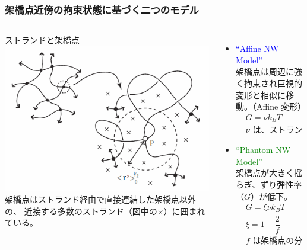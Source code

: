 \documentclass[12pt, dvipdfmx]{beamer}
\begin{document}
\begin{frame}
	\frametitle{架橋点近傍の拘束状態に基づく二つのモデル}
	\vspace{-3mm}
		\begin{columns}[totalwidth=1\textwidth]
				\begin{block}{ストランドと架橋点}
					\includegraphics[width=\textwidth]{JP_vicinity.png}
					架橋点はストランド経由で直接連結した架橋点以外の、
					\alert{近接する多数のストランド（図中の×）に囲まれている。}
				\end{block}
			\begin{itemize}
				\item \textcolor{blue}{``Affine NW Model''}\\[2mm]
					架橋点は周辺に強く拘束され巨視的変形と相似に移動。（Affine 変形）
					\footnotesize
					\begin{align*}
						&G=\nu k_B T \\
						&\text{$\nu$ は、ストランドの数密度}
					\end{align*}
					\normalsize
				\item \textcolor{green}{``Phantom NW Model''}\\[2mm]
					架橋点が大きく揺らぎ、ずり弾性率（$G$）が低下。
					\footnotesize
					\begin{align*}
						&G=\xi \nu k_B T \\
						&\xi= 1 -\dfrac{2}{f}\\
						&\text{$f$ は架橋点の分岐数}
					\end{align*}
			\end{itemize}
		\end{columns}
\end{frame}
\end{document}
